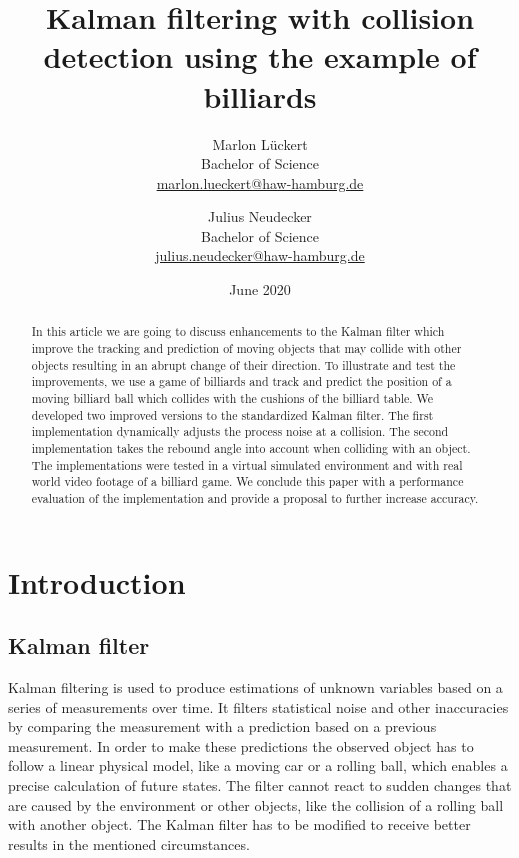 \documentclass[titlepage, a4paper, 11pt]{scrartcl}
\begin{document}
    \title{Kalman filtering with collision detection using the example of billiards}
    \author{Marlon Lückert \\ Bachelor of Science \\ \href{mailto:marlon.lueckert@haw-hamburg.de}{marlon.lueckert@haw-hamburg.de} 
    \and Julius Neudecker \\ Bachelor of Science \\ \href{mailto:julius.neudecker@haw-hamburg.de}{julius.neudecker@haw-hamburg.de} }
    \date{June 2020}
    \maketitle

    \tableofcontents

\begin{abstract}
In this article we are going to discuss enhancements to the Kalman filter \cite{kalman} which improve the tracking and prediction of moving objects
that may collide with other objects resulting in an abrupt change of their direction.
To illustrate and test the improvements, we use a game of billiards and track and predict the position of a moving billiard ball which collides with the cushions of the billiard table.
We developed two improved versions to the standardized Kalman filter.
The first implementation dynamically adjusts the process noise at a collision.
The second implementation takes the rebound angle into account when colliding with an object. 
The implementations were tested in a virtual simulated environment and with real world video footage of a billiard game.
We conclude this paper with a performance evaluation of the implementation and provide a proposal to further increase accuracy.
\end{abstract}


\section{Introduction}

\subsection{Kalman filter}

Kalman filtering is used to produce estimations of unknown variables based on a series of measurements over time.
It filters statistical noise and other inaccuracies by comparing the measurement with a prediction based on a previous measurement.
In order to make these predictions the observed object has to follow a linear physical model, like a moving car or a rolling ball, which enables a precise calculation of future states.
The filter cannot react to sudden changes that are caused by the environment or other objects, like the collision of a rolling ball with another object.
The Kalman filter has to be modified to receive better results in the mentioned circumstances.
\end{document}
